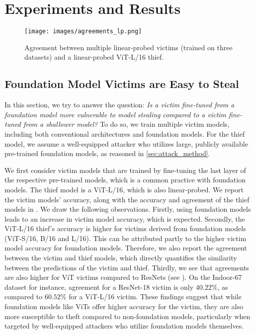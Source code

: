 
\section{Experiments and Results}

\begin{wrapfigure}{R}{0.45\textwidth}
	\centering
	\texttt{[image: images/agreements\_lp.png]}
	\vspace{-3mm}
	\caption{
		\small{Agreement between multiple linear-probed victims (trained on three datasets) and a linear-probed ViT-L/16 thief.}
	}
	\label{fig:expt1_agr}
	\vspace{-2mm}
\end{wrapfigure}


\subsection{Foundation Model Victims are Easy to Steal} \label{sec:expt1}
In this section, we try to answer the question: \emph{Is a victim fine-tuned from a foundation model more vulnerable to model stealing compared to a victim fine-tuned from a shallower model?} 
%
To do so, we train multiple victim models, including both conventional architectures and foundation models. For the thief model, we assume a well-equipped attacker who utilizes large, publicly available pre-trained foundation models, as reasoned in \ref{sec:attack_method}. 

 \label{main_expt}
We first consider victim models that are trained by fine-tuning the last layer of the respective pre-trained models, which is a common practice with foundation models. The thief model is a ViT-L/16, which is also linear-probed. We report the victim models' accuracy, along with the accuracy and agreement of the thief models in . We draw the following observations.
%
Firstly, using foundation models leads to an increase in victim model accuracy, which is expected.
%
Secondly, the ViT-L/16 thief's accuracy is higher for victims derived from foundation models (ViT-S/16, B/16 and L/16). This can be attributed partly to the higher victim model accuracy for foundation models. Therefore, we also report the agreement between the victim and thief models, which directly quantifies the similarity between the predictions of the victim and thief.
%
Thirdly, we see that agreements are also higher for ViT victims compared to ResNets (see ). On the Indoor-67 dataset for instance, agreement for a ResNet-18 victim is only $40.22\%$, as compared to $60.52\%$ for a ViT-L/16 victim. These findings suggest that while foundation models like ViTs offer higher accuracy for the victim, they are also more susceptible to theft compared to non-foundation models, particularly when targeted by well-equipped attackers who utilize foundation models themselves.

